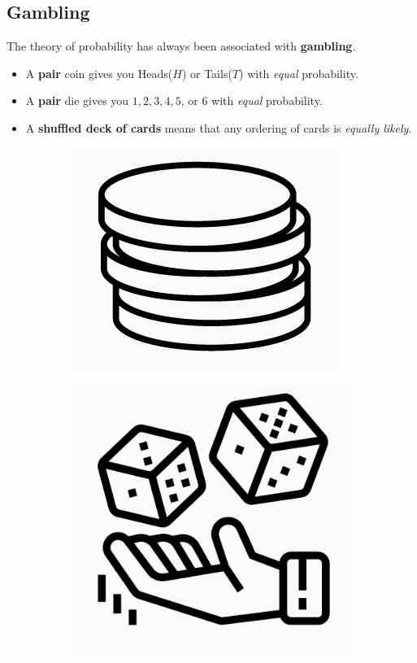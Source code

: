 \documentclass[12pt,a4paper]{article}
\theoremstyle{definition}
\theoremstyle{definition}
\theoremstyle{definition}
\theoremstyle{definition}
\theoremstyle{remark}
\theoremstyle{definition}
\begin{document}
\subsection{Gambling}
The theory of probability has always been associated with \textbf{gambling}.\begin{itemize}
	\item A \textbf{pair} coin gives you Heads($H$) or Tails($T$) with \textit{equal} probability.
	\item A \textbf{pair} die gives you $1,2,3,4,5$, or $6$ with \textit{equal} probability.
	\item A \textbf{shuffled deck of cards} means that any ordering of cards is \textit{equally likely}.
\end{itemize}
\begin{figure}[h!]
	\centering
	\begin{subfigure}{.3\textwidth}
		\centering
		\includegraphics[width=.5\linewidth]{coins.png}
	\end{subfigure}%
	\begin{subfigure}{.3\textwidth}
		\centering
		\includegraphics[width=.5\linewidth]{dies.png}
	\end{subfigure}%
	\begin{subfigure}{.3\textwidth}
		\centering

\end{subfigure}
\end{figure}
\end{document}
